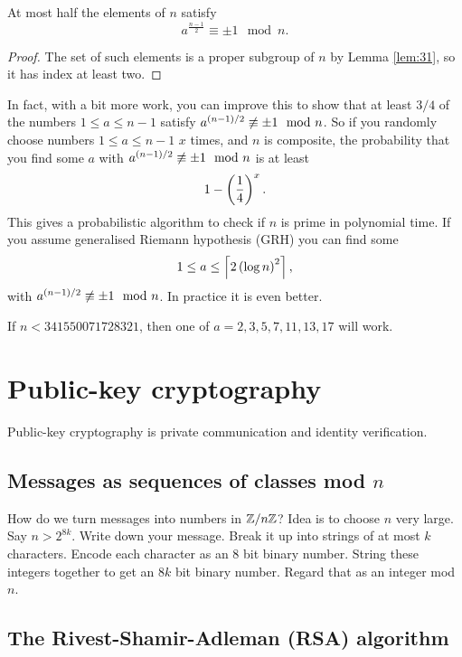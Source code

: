 \begin{corollary}
At most half the elements of $ \unit{n} $ satisfy
$$ a^{\tfrac{n - 1}{2}} \equiv \pm 1 \mod n. $$
\end{corollary}

\begin{proof}
The set of such elements is a proper subgroup of $ \unit{n} $ by Lemma \ref{lem:31}, so it has index at least two.
\end{proof}

In fact, with a bit more work, you can improve this to show that at least $ 3 / 4 $ of the numbers $ 1 \le a \le n - 1 $ satisfy $ a^{\left( n - 1 \right) / 2} \not\equiv \pm 1 \mod n $. So if you randomly choose numbers $ 1 \le a \le n - 1 $ $ x $ times, and $ n $ is composite, the probability that you find some $ a $ with $ a^{\left( n - 1 \right) / 2} \not\equiv \pm 1 \mod n $ is at least
$$ 1 - \left( \dfrac{1}{4} \right)^x. $$
This gives a probabilistic algorithm to check if $ n $ is prime in polynomial time. If you assume generalised Riemann hypothesis (GRH) you can find some
$$ 1 \le a \le \left\lceil 2 \left( \log n \right)^2 \right\rceil, $$
with $ a^{\left( n - 1 \right) / 2} \not\equiv \pm 1 \mod n $. In practice it is even better.

\begin{example2}
If $ n < 341550071728321 $, then one of $ a = 2, 3, 5, 7, 11, 13, 17 $ will work.
\end{example2}

\pagebreak

\section{Public-key cryptography}

Public-key cryptography is private communication and identity verification.

\subsection{Messages as sequences of classes mod $ n $}

How do we turn messages into numbers in $ \mathbb{Z} / n\mathbb{Z} $? Idea is to choose $ n $ very large. Say $ n > 2^{8k} $. Write down your message. Break it up into strings of at most $ k $ characters. Encode each character as an $ 8 $ bit binary number. String these integers together to get an $ 8k $ bit binary number. Regard that as an integer mod $ n $.

\subsection{The Rivest-Shamir-Adleman (RSA) algorithm}


